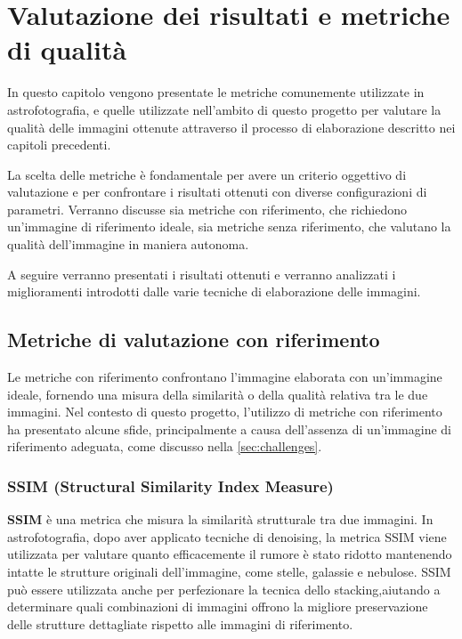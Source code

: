 \chapter{Valutazione dei risultati e metriche di qualità} \label{chap:evaluation}

In questo capitolo vengono presentate le metriche comunemente utilizzate in astrofotografia, e quelle utilizzate nell'ambito di questo progetto per valutare la qualità delle immagini ottenute attraverso il processo di elaborazione descritto nei capitoli precedenti.

La scelta delle metriche è fondamentale per avere un criterio oggettivo di valutazione e per confrontare i risultati ottenuti con diverse configurazioni di parametri. Verranno discusse sia metriche con riferimento, che richiedono un'immagine di riferimento ideale, sia metriche senza riferimento, che valutano la qualità dell'immagine in maniera autonoma.

A seguire verranno presentati i risultati ottenuti e verranno analizzati i miglioramenti introdotti dalle varie tecniche di elaborazione delle immagini.

\section{Metriche di valutazione con riferimento} \label{sec:r_metrics}

Le metriche con riferimento confrontano l'immagine elaborata con un'immagine ideale, fornendo una misura della similarità o della qualità relativa tra le due immagini. Nel contesto di questo progetto, l'utilizzo di metriche con riferimento ha presentato alcune sfide, principalmente a causa dell'assenza di un'immagine di riferimento adeguata, come discusso nella \cref{sec:challenges}.

\subsection{SSIM (Structural Similarity Index Measure)} \label{subsec:ssim}

\textbf{SSIM} è una metrica che misura la similarità strutturale tra due immagini. In astrofotografia, dopo aver applicato tecniche di denoising, la metrica SSIM viene utilizzata per valutare quanto efficacemente il rumore è stato ridotto mantenendo intatte le strutture originali dell'immagine, come stelle, galassie e nebulose. SSIM può essere utilizzata anche per perfezionare la tecnica dello stacking,aiutando a determinare quali combinazioni di immagini offrono la migliore preservazione delle strutture dettagliate rispetto alle immagini di riferimento. 


